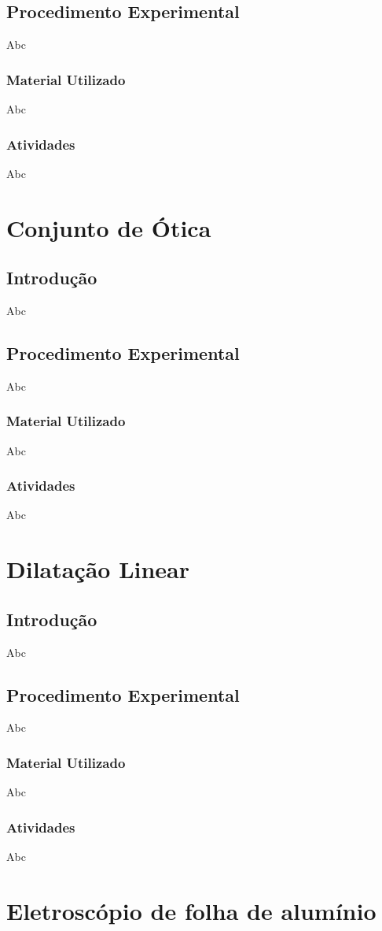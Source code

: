 \documentclass[12pt,a4paper]{article}
\begin{document}
		\subsection{Procedimento Experimental}
		Abc
		\subsubsection{Material Utilizado}
		Abc
		\subsubsection{Atividades}
		Abc
	\section{Conjunto de Ótica}
		\subsection{Introdução}
		Abc
		\subsection{Procedimento Experimental}
		Abc
		\subsubsection{Material Utilizado}
		Abc
		\subsubsection{Atividades}
		Abc
	\section{Dilatação Linear}
		\subsection{Introdução}
		Abc
		\subsection{Procedimento Experimental}
		Abc
		\subsubsection{Material Utilizado}
		Abc
		\subsubsection{Atividades}
		Abc
	\section{Eletroscópio de folha de alumínio}
\end{document}
